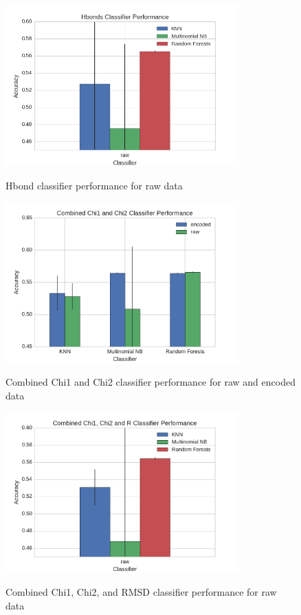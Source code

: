 \documentclass{article}
\begin{document}
\begin{figure}
  \caption{Hbond classifier performance for raw data}
  \centering
  \includegraphics[width=0.8\textwidth]{hbonds_raw.png}
  \label{fig:hbonds_raw}
\end{figure}

\begin{figure}
  \caption{Combined Chi1 and Chi2 classifier performance for raw and encoded data}
  \centering
  \includegraphics[width=0.8\textwidth]{chi1_chi2_cv.pdf}
  \label{fig:chi1_chi2_cv}
\end{figure}

\begin{figure}
  \caption{Combined Chi1, Chi2, and RMSD classifier performance for raw data}
  \centering
  \includegraphics[width=0.8\textwidth]{chi1_chi2_r.pdf}
  \label{fig:chi1_chi2_r}
\end{figure}
\end{document}

